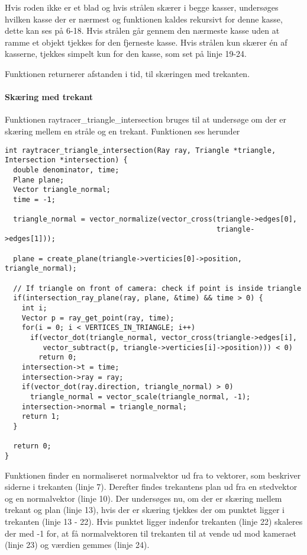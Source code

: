 Hvis roden ikke er et blad og hvis strålen skærer i begge kasser, undersøges hvilken kasse der er nærmest og funktionen kaldes rekursivt for denne kasse, dette kan ses på 6-18. Hvis strålen går gennem den nærmeste kasse uden at ramme et objekt tjekkes for den fjerneste kasse. Hvis strålen kun skærer én af kasserne, tjekkes simpelt kun for den kasse, som set på linje 19-24.

Funktionen returnerer afstanden i tid, til skæringen med trekanten.

\paragraph{Skæring med trekant}

Funktionen raytracer\_triangle\_intersection bruges til at undersøge om der er skæring mellem en stråle og en trekant. Funktionen ses herunder

\begin{lstlisting}[style=Cstyle, caption=Funktionen der finder skæring med trekant]
int raytracer_triangle_intersection(Ray ray, Triangle *triangle, Intersection *intersection) {
  double denominator, time;
  Plane plane;
  Vector triangle_normal;
  time = -1;

  triangle_normal = vector_normalize(vector_cross(triangle->edges[0], 
                                                  triangle->edges[1]));

  plane = create_plane(triangle->verticies[0]->position, triangle_normal);

  // If triangle on front of camera: check if point is inside triangle
  if(intersection_ray_plane(ray, plane, &time) && time > 0) {
    int i;
    Vector p = ray_get_point(ray, time);
    for(i = 0; i < VERTICES_IN_TRIANGLE; i++)
      if(vector_dot(triangle_normal, vector_cross(triangle->edges[i], 
         vector_subtract(p, triangle->verticies[i]->position))) < 0)
        return 0;
    intersection->t = time;
    intersection->ray = ray;
    if(vector_dot(ray.direction, triangle_normal) > 0)
      triangle_normal = vector_scale(triangle_normal, -1);
    intersection->normal = triangle_normal;
    return 1;
  }

  return 0;
}
\end{lstlisting}

Funktionen finder en normaliseret normalvektor ud fra to vektorer, som beskriver siderne i trekanten (linje 7). Derefter findes trekantens plan ud fra en stedvektor og en normalvektor (linje 10). Der undersøges nu, om der er skæring mellem trekant og plan (linje 13), hvis der er skæring tjekkes der om punktet ligger i trekanten (linje 13 - 22). Hvis punktet ligger indenfor trekanten (linje 22) skaleres der med -1 for, at få normalvektoren til trekanten til at vende ud mod kameraet (linje 23) og værdien gemmes (linje 24).

